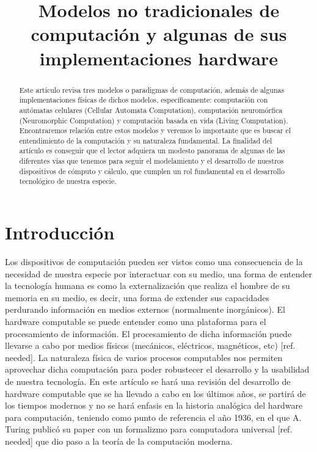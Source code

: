 \documentclass[conference]{IEEEtran}
\begin{document}
\title{Modelos no tradicionales de computación y algunas de sus implementaciones hardware}

\author{
}

\maketitle

\begin{abstract}
Este artículo revisa tres modelos o paradigmas de computación, además de algunas implementaciones físicas de dichos modelos, específicamente: computación con autómatas celulares (Cellular Automata Computation), computación neuromórfica (Neuromorphic Computation) y computación basada en vida (Living Computation). Encontraremos relación entre estos modelos y veremos lo importante que es buscar el entendimiento de la computación y su naturaleza fundamental.  La finalidad del artículo es conseguir que el lector adquiera un modesto panorama de algunas de las diferentes vías que tenemos para seguir el modelamiento y el desarrollo de nuestros dispositivos de cómputo y cálculo, que cumplen un rol fundamental en el desarrollo tecnológico de nuestra especie.
\end{abstract}

\section{Introducción}
Los dispositivos de computación pueden ser vistos como una consecuencia de la necesidad de nuestra especie por interactuar con su medio, una forma de entender la tecnología humana es como la externalización que realiza el hombre de su memoria en su medio, es decir, una forma de extender sus capacidades perdurando información en medios externos (normalmente inorgánicos). El hardware computable se puede entender como una plataforma para el procesamiento de información. El procesamiento de dicha información puede llevarse a cabo por medios físicos (mecánicos, eléctricos, magnéticos, etc) [ref. needed]. La naturaleza física de varios procesos computables nos permiten aprovechar dicha computación para poder robustecer el desarrollo y la usabilidad de nuestra tecnología. En este artículo se hará una revisión del desarrollo de hardware computable que se ha llevado a cabo en los últimos años, se partirá de los tiempos modernos y no se hará enfasis en la historia analógica del hardware para computación, teniendo como punto de referencia el año 1936, en el que A. Turing publicó su paper con un formalizmo para computadora universal [ref. needed] que dio paso a la teoría de la computación moderna.
\end{document}
